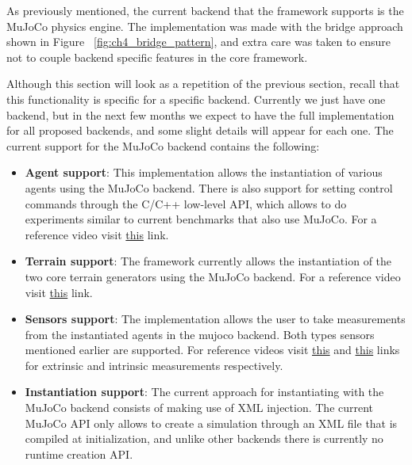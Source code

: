 As previously mentioned, the current backend that the framework supports is the
MuJoCo physics engine. The implementation was made with the bridge approach shown
in Figure ~\ref{fig:ch4_bridge_pattern}, and extra care was taken to ensure not
to couple backend specific features in the core framework. 

Although this section will look as a repetition of the previous section, recall
that this functionality is specific for a specific backend. Currently we just have
one backend, but in the next few months we expect to have the full implementation
for all proposed backends, and some slight details will appear for each one. The 
current support for the MuJoCo backend contains the following:

\begin{itemize}
    \item \textbf{Agent support}: This implementation allows the instantiation of 
          various agents using the MuJoCo backend. There is also support for setting 
          control commands through the C/C++ low-level API, which allows to do 
          experiments similar to current benchmarks that also use MuJoCo. For a reference 
          video visit \href{https://youtu.be/5zv5SK0o92I}{this} link.

    \item \textbf{Terrain support}: The framework currently allows the instantiation 
          of the two core terrain generators using the MuJoCo backend. For a reference 
          video visit \href{https://youtu.be/xWdNFGlhlOA}{this} link.

    \item \textbf{Sensors support}: The implementation allows the user to take 
          measurements from the instantiated agents in the mujoco backend. Both
          types sensors mentioned earlier are supported. For reference 
          videos visit \href{https://youtu.be/-EJMER5AGRQ}{this} and 
          \href{https://youtu.be/c0R81VBZ72o}{this} links for extrinsic and intrinsic
           measurements respectively.

    \item \textbf{Instantiation support}: The current approach for instantiating
          with the MuJoCo backend consists of making use of XML injection. The
          current MuJoCo API only allows to create a simulation through an XML
          file that is compiled at initialization, and unlike other backends there
          is currently no runtime creation API. 


\end{itemize}
